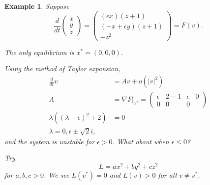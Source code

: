 \documentclass{tufte-handout}
\newtheorem{ex}[thm]{Example}
\theoremstyle{definition}
\begin{document}
\begin{ex}
	Suppose \[
		\frac{d}{dt} \begin{pmatrix}
		x \\
		y \\ z
		\end{pmatrix} = \begin{pmatrix}
		\left( \epsilon x \right)(z+1) \\
		(-x+\epsilon y)(z+ 1) \\
		-z^2
		\end{pmatrix} = F\left( v \right)
	.\] 

	The only equilibrium is $x^* = (0,0,0)$. 

	Using the method of Taylor expansion,
	\begin{align*}
		\frac{d}{dt} v &= A v + o \left( \left| v \right|^2 \right) \\
		A &= \nabla F \left. \right|_{x^*} = \begin{pmatrix}
				\epsilon &  2 %
				-1 & \epsilon & 0\\
				0 & 0 &0
		\end{pmatrix}  \\
		\lambda\left( \left( \lambda - \epsilon \right)^2 + 2 \right) &=  0 \\
		\lambda = 0, \epsilon \pm \sqrt{2} i
	,\end{align*}
	and the system is unstable for $\epsilon > 0$. What about when $\epsilon \le 0$?

	Try \[
		L = ax^2 + by^2 + cz^2
	\] for $a,b,c > 0$. 
	We see $L(v^*) = 0$ and $L(v) > 0$ for all $v \ne v^*$.


\end{ex}
\end{document}
